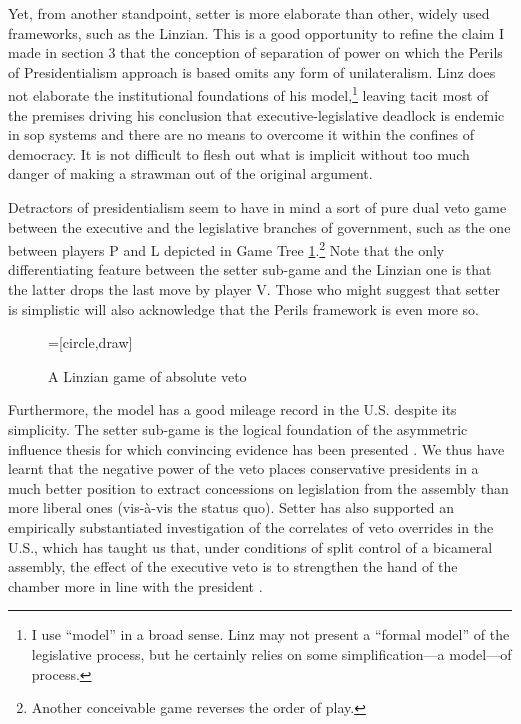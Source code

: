 Yet, from another standpoint, setter is more elaborate than other, widely used frameworks, such as the Linzian.  This is a good opportunity to refine the claim I made in section 3 that the conception of separation of power on which the Perils of Presidentialism approach is based omits any form of unilateralism.  Linz does not elaborate the institutional foundations of his model,\footnote{I use ``model'' in a broad sense.  Linz may not present a ``formal model'' of the legislative process, but he certainly relies on some simplification---a model---of process.} leaving tacit most of the premises driving his conclusion that executive-legislative deadlock is endemic in sop systems and there are no means to overcome it within the confines of democracy.  It is not difficult to flesh out what is implicit without too much danger of making a strawman out of the original argument. 

Detractors of presidentialism seem to have in mind a sort of pure dual veto game between the executive and the legislative branches of government, such as the one between players P and L depicted in Game Tree \ref{f:LinzGame}.\footnote{Another conceivable game reverses the order of play.}  Note that the only differentiating feature between the setter sub-game and the Linzian one is that the latter drops the last move by player V.  Those who might suggest that setter is simplistic will also acknowledge that the Perils framework is even more so.

\begin{figure}
  \begin{center}
    =[circle,draw]
    \caption{A Linzian game of absolute veto}\label{f:LinzGame}
  \end{center}
\end{figure}

Furthermore, the model has a good mileage record in the U.S. despite its simplicity.  The setter sub-game is the logical foundation of the asymmetric influence thesis for which convincing evidence has been presented \citep{kiewiet.mccubbins.1988}. We thus have learnt that the negative power of the veto places conservative presidents in a much better position to extract concessions on legislation from the assembly than more liberal ones (vis-à-vis the status quo).  Setter has also supported an empirically substantiated investigation of the correlates of veto overrides in the U.S., which has taught us that, under conditions of split control of a bicameral assembly, the effect of the executive veto is to strengthen the hand of the chamber more in line with the president \citep[chapter 5 in][]{cameron.2000}.

